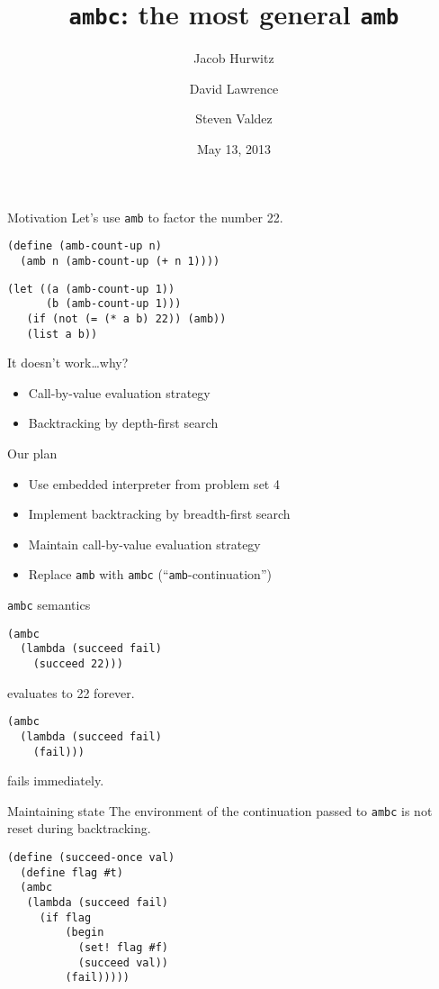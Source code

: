 \documentclass[14pt]{beamer}
\title{\texttt{ambc}: the most general \texttt{amb}}
\author[dlaw, dvorak42, jhurwitz]
  {Jacob Hurwitz \and David Lawrence \and Steven Valdez}
\date{May 13, 2013}
\begin{document}
\titlepage

\begin{frame}[fragile]{Motivation}
 Let's use \texttt{amb} to factor the number 22.

\begin{lstlisting}
(define (amb-count-up n)
  (amb n (amb-count-up (+ n 1))))
\end{lstlisting}
\begin{lstlisting}
(let ((a (amb-count-up 1))
      (b (amb-count-up 1)))
   (if (not (= (* a b) 22)) (amb))
   (list a b))
\end{lstlisting}

\pause

It doesn't work\ldots why?

\pause

  \begin{itemize}
  \item Call-by-value evaluation strategy
    \pause
  \item Backtracking by depth-first search
  \end{itemize}
\end{frame}

\begin{frame}[fragile]{Our plan}
  \begin{itemize}
  \item Use embedded interpreter from problem set 4
    \pause
  \item Implement backtracking by breadth-first search
    \pause
  \item Maintain call-by-value evaluation strategy
    \pause
  \item Replace \texttt{amb} with \texttt{ambc} (``\texttt{amb}-continuation'')
  \end{itemize}
\end{frame}

\begin{frame}[fragile]{\texttt{ambc} semantics}
\begin{lstlisting}
(ambc
  (lambda (succeed fail)
    (succeed 22)))
\end{lstlisting}
evaluates to 22 forever.

\vfill

\begin{lstlisting}
(ambc
  (lambda (succeed fail)
    (fail)))
\end{lstlisting}
fails immediately.
\end{frame}

\begin{frame}[fragile]{Maintaining state}
  The environment of the continuation passed to \texttt{ambc} is not
  reset during backtracking.
  \begin{lstlisting}
(define (succeed-once val)
  (define flag #t)
  (ambc
   (lambda (succeed fail)
     (if flag
         (begin
           (set! flag #f)
           (succeed val))
         (fail)))))
  \end{lstlisting}
\end{frame}
\end{document}

